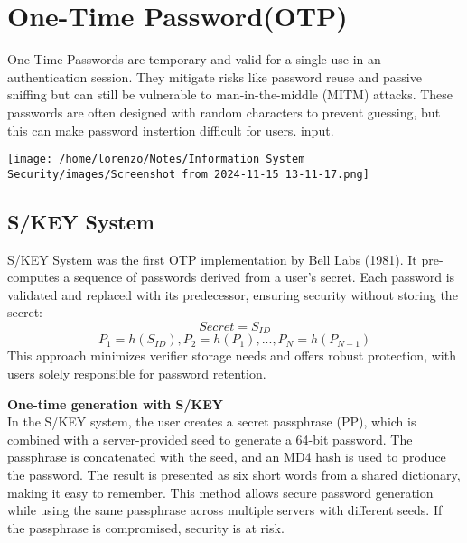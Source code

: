 \section{One-Time Password(OTP)}
\begin{minipage}{0.6\textwidth}
\vspace{-1.0cm}
One-Time Passwords are temporary and valid for a single use in an authentication session. They mitigate risks like password reuse and passive sniffing but can still be vulnerable to man-in-the-middle (MITM) attacks. 
These passwords are often designed 
with random characters to prevent 
guessing, but this can make password instertion difficult for users. 
input.
\end{minipage} 
\hspace{0.5cm}
\begin{minipage}{0.4\textwidth}
    
    \texttt{[image: /home/lorenzo/Notes/Information System Security/images/Screenshot from 2024-11-15 13-11-17.png]}
\end{minipage}

\subsection{S/KEY System}
S/KEY System was the first OTP implementation by Bell Labs (1981).
It pre-computes a sequence of passwords derived from a user’s secret. 
Each password is validated and replaced with its predecessor, ensuring security 
without storing the secret:
\[Secret = S_{ID}\]
\[P_1=h(S_{ID}),P_2=h(P_1),...,P_N=h(P_{N-1})\]
\noindent
This approach 
minimizes verifier storage needs and offers robust protection, with users solely 
responsible for password retention.

\begin{customquote}
\textbf{One-time generation with S/KEY}
\\In the S/KEY system, the user creates 
a secret passphrase (PP), which is combined 
with a server-provided seed to generate a 64-bit 
password. The passphrase is concatenated with the seed, 
and an MD4 hash is used to produce the password. 
The result is presented as six short words from a shared 
dictionary, making it easy to remember. This method allows secure password generation while using the same passphrase across multiple servers with different seeds. If the passphrase is compromised, security is at risk.
\end{customquote}

